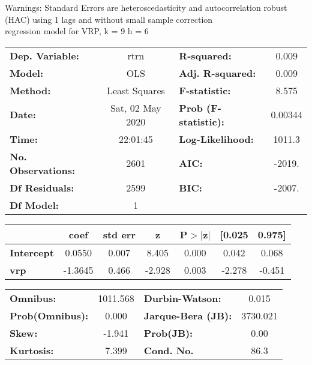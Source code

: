 Warnings: \newline
 [1] Standard Errors are heteroscedasticity and autocorrelation robust (HAC) using 1 lags and without small sample correction\\ 

regression model for VRP, k = 9 h = 6\begin{center}
\begin{tabular}{lclc}
\toprule
\textbf{Dep. Variable:}    &       rtrn       & \textbf{  R-squared:         } &     0.009   \\
\textbf{Model:}            &       OLS        & \textbf{  Adj. R-squared:    } &     0.009   \\
\textbf{Method:}           &  Least Squares   & \textbf{  F-statistic:       } &     8.575   \\
\textbf{Date:}             & Sat, 02 May 2020 & \textbf{  Prob (F-statistic):} &  0.00344    \\
\textbf{Time:}             &     22:01:45     & \textbf{  Log-Likelihood:    } &    1011.3   \\
\textbf{No. Observations:} &        2601      & \textbf{  AIC:               } &    -2019.   \\
\textbf{Df Residuals:}     &        2599      & \textbf{  BIC:               } &    -2007.   \\
\textbf{Df Model:}         &           1      & \textbf{                     } &             \\
\bottomrule
\end{tabular}
\begin{tabular}{lcccccc}
                   & \textbf{coef} & \textbf{std err} & \textbf{z} & \textbf{P$> |$z$|$} & \textbf{[0.025} & \textbf{0.975]}  \\
\midrule
\textbf{Intercept} &       0.0550  &        0.007     &     8.405  &         0.000        &        0.042    &        0.068     \\
\textbf{vrp}       &      -1.3645  &        0.466     &    -2.928  &         0.003        &       -2.278    &       -0.451     \\
\bottomrule
\end{tabular}
\begin{tabular}{lclc}
\textbf{Omnibus:}       & 1011.568 & \textbf{  Durbin-Watson:     } &    0.015  \\
\textbf{Prob(Omnibus):} &   0.000  & \textbf{  Jarque-Bera (JB):  } & 3730.021  \\
\textbf{Skew:}          &  -1.941  & \textbf{  Prob(JB):          } &     0.00  \\
\textbf{Kurtosis:}      &   7.399  & \textbf{  Cond. No.          } &     86.3  \\
\bottomrule
\end{tabular}
\end{center}


